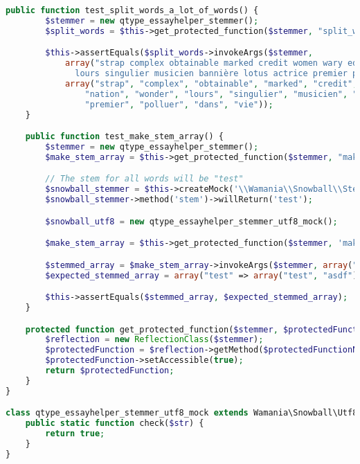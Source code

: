 \begin{lstlisting}[language=php,frame=l,style=default]
    public function test_split_words_a_lot_of_words() {
        $stemmer = new qtype_essayhelper_stemmer();
        $split_words = $this->get_protected_function($stemmer, "split_words");

        $this->assertEquals($split_words->invokeArgs($stemmer,
            array("strap complex obtainable marked credit women wary educate nation wonder
              lours singulier musicien bannière lotus actrice premier polluer dans vie")),
            array("strap", "complex", "obtainable", "marked", "credit", "women", "wary", "educate",
                "nation", "wonder", "lours", "singulier", "musicien", "bannière", "lotus", "actrice",
                "premier", "polluer", "dans", "vie"));
    }

    public function test_make_stem_array() {
        $stemmer = new qtype_essayhelper_stemmer();
        $make_stem_array = $this->get_protected_function($stemmer, "make_stem_array");

        // The stem for all words will be "test"
        $snowball_stemmer = $this->createMock('\\Wamania\\Snowball\\Stemmer', array('stem'));
        $snowball_stemmer->method('stem')->willReturn('test');

        $snowball_utf8 = new qtype_essayhelper_stemmer_utf8_mock();

        $make_stem_array = $this->get_protected_function($stemmer, 'make_stem_array');

        $stemmed_array = $make_stem_array->invokeArgs($stemmer, array("test asdf", $snowball_stemmer, $snowball_utf8));
        $expected_stemmed_array = array("test" => array("test", "asdf"));

        $this->assertEquals($stemmed_array, $expected_stemmed_array);
    }

    protected function get_protected_function($stemmer, $protectedFunctionName) {
        $reflection = new ReflectionClass($stemmer);
        $protectedFunction = $reflection->getMethod($protectedFunctionName);
        $protectedFunction->setAccessible(true);
        return $protectedFunction;
    }
}

class qtype_essayhelper_stemmer_utf8_mock extends Wamania\Snowball\Utf8 {
    public static function check($str) {
        return true;
    }
}
\end{lstlisting}